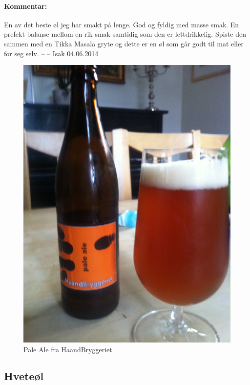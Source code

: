 \documentclass[12pt,a4paper,oneside,norsk]{article}
\begin{document}
\paragraph{Kommentar:} En av det beste øl jeg har smakt på lenge. God og fyldig med masse smak. En prefekt balanse mellom en rik smak samtidig som den er lettdrikkelig. Spiste den sammen med en Tikka Masala gryte og dette er en øl som går godt til mat eller for seg selv.
\newline
-- -- Isak 04.06.2014

\begin{figure} [H]
\centering
\includegraphics[scale=0.1, angle=270]{Bilder/Ol/palealehaand}
\caption{Pale Ale fra HaandBryggeriet}
\end{figure}

\newpage
\subsection{Hveteøl}
\end{document}
